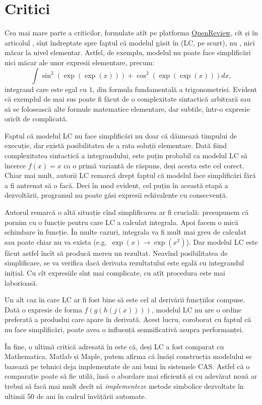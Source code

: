 \section{Critici}

Cea mai mare parte a criticilor, formulate atît pe platforma
\href{https://openreview.net/forum?id=S1eZYeHFDS}{OpenReview}, cît și
în articolul \cite{davis2019use}, sînt îndreptate spre faptul că
modelul găsit în \cite{lample2019deep} (LC, pe scurt), nu 
, nici măcar la nivel elementar. Astfel,
de exemplu, modelul nu poate face simplificări nici măcar ale unor
expresii elementare, precum:
\[
    \int \sin^2(\exp(\exp(x))) + \cos^2(\exp(\exp(x))) dx,
\]
integrand care este egal cu $ 1 $, din formula fundamentală a
trigonometriei. Evident că exemplul de mai sus poate fi făcut
de o complexitate sintactică arbitrară sau să se folosească
alte formule matematice elementare, dar subtile, într-o expresie
oricît de complicată. 

Faptul că modelul LC nu face simplificări nu doar că dăunează 
timpului de execuție, dar există posibilitatea de a rata soluții
elementare. Dată fiind complexitatea sintactică a integrandului,
este puțin probabil ca modelul LC să încerce $ f(x) = x $ ca o primă
variantă de răspuns, deși acesta este cel corect. Chiar mai mult,
autorii LC remarcă drept  faptul că modelul face
simplificări fără a fi antrenat să o facă. Deci în mod evident,
cel puțin în această etapă a dezvoltării, programul nu poate găsi
expresii echivalente cu consecvență.

Autorul \cite{davis2019use} remarcă o altă situație cînd simplificarea
ar fi crucială: presupunem că pornim cu o funcție pentru care LC a
calculat integrala. Apoi facem o mică schimbare în funcție. În multe
cazuri, integrala va fi mult mai greu de calculat sau poate chiar nu
va exista (e.g.\ $\exp(x) \to \exp(x^2) $). Dar modelul LC este făcut
astfel încît să producă mereu un rezultat. Neavînd posibilitatea de
simplificare, se va verifica dacă derivata rezultatului este egală
cu integrandul inițial. Cu cît expresiile sînt mai complicate, cu atît
procedura este mai laborioasă.

Un alt caz în care LC ar fi fost bine să  este cel al
derivării funcțiilor compuse. Dată o expresie de forma $ f(g(h(j(x)))) $,
modelul LC nu are o ordine preferată a produslui care apare în derivată.
Acest lucru, coroborat cu faptul că nu face simplificări, poate avea
o influență semnificativă asupra performanței.

În fine, o ultimă critică adresată în \cite{davis2019use} este că, deși
LC a fost comparat cu Mathematica, Matlab și Maple, putem afirma că
însăși construcția modelului se bazează pe tehnici deja implementate de
ani buni în sistemele CAS. Astfel că o comparație poate să fie utilă,
însă o abordare mai eficientă și cu adevărat nouă ar trebui să facă mai
mult decît să \emph{implementeze} metode simbolice dezvoltate în ultimii
50 de ani în cadrul învățării automate.
